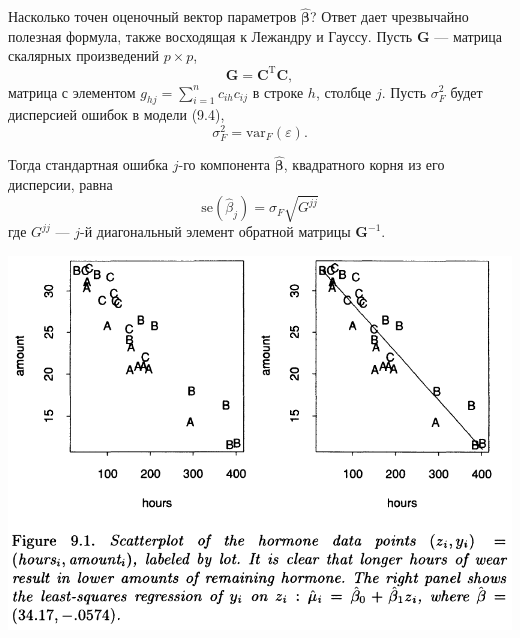 Насколько точен оценочный вектор параметров $\hat{\bm{\beta}}$? Ответ дает чрезвычайно полезная формула, также восходящая к Лежандру и Гауссу. Пусть $\textbf{G}$ --- матрица скалярных произведений $p \times p$,
\begin{equation}
	\textbf{G} = \textbf{C}^\text{T}\textbf{C},
\end{equation}
матрица с элементом $g_{hj} = \sum\limits_{i=1}^{n} c_{ih} c_{ij}$ в строке $h$, столбце $j$. Пусть $\sigma^2_F$ будет дисперсией ошибок в модели (9.4),
\begin{equation}
	\sigma^2_F = \text{var}_F(\varepsilon).
\end{equation}

Тогда стандартная ошибка $j$-го компонента $\hat{\bm{\beta}}$, квадратного корня из его дисперсии, равна
\begin{equation}
	\text{se}(\hat{\beta}_j) = \sigma_F \sqrt{G^{jj}}
\end{equation}
где $G^{jj}$ --- $j$-й диагональный элемент обратной матрицы $\textbf{G}^{-1}$.

\noindent
\includegraphics[width=\linewidth]{9/f91}
\newline

